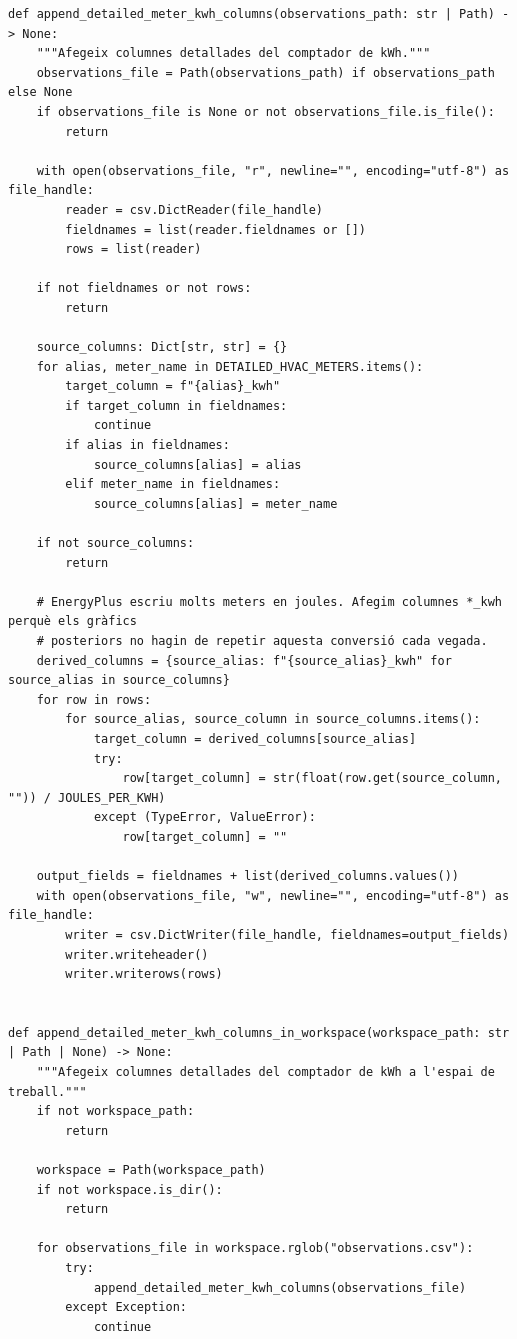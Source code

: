\documentclass[10pt,a4paper]{article}
\begin{document}
\begin{lstlisting}[style=studioPython,caption={backend/entrenar\_agent\_artifacts.py},label={lst:backend-entrenar-agent-artifacts-py}]
def append_detailed_meter_kwh_columns(observations_path: str | Path) -> None:
    """Afegeix columnes detallades del comptador de kWh."""
    observations_file = Path(observations_path) if observations_path else None
    if observations_file is None or not observations_file.is_file():
        return

    with open(observations_file, "r", newline="", encoding="utf-8") as file_handle:
        reader = csv.DictReader(file_handle)
        fieldnames = list(reader.fieldnames or [])
        rows = list(reader)

    if not fieldnames or not rows:
        return

    source_columns: Dict[str, str] = {}
    for alias, meter_name in DETAILED_HVAC_METERS.items():
        target_column = f"{alias}_kwh"
        if target_column in fieldnames:
            continue
        if alias in fieldnames:
            source_columns[alias] = alias
        elif meter_name in fieldnames:
            source_columns[alias] = meter_name

    if not source_columns:
        return

    # EnergyPlus escriu molts meters en joules. Afegim columnes *_kwh perquè els gràfics
    # posteriors no hagin de repetir aquesta conversió cada vegada.
    derived_columns = {source_alias: f"{source_alias}_kwh" for source_alias in source_columns}
    for row in rows:
        for source_alias, source_column in source_columns.items():
            target_column = derived_columns[source_alias]
            try:
                row[target_column] = str(float(row.get(source_column, "")) / JOULES_PER_KWH)
            except (TypeError, ValueError):
                row[target_column] = ""

    output_fields = fieldnames + list(derived_columns.values())
    with open(observations_file, "w", newline="", encoding="utf-8") as file_handle:
        writer = csv.DictWriter(file_handle, fieldnames=output_fields)
        writer.writeheader()
        writer.writerows(rows)


def append_detailed_meter_kwh_columns_in_workspace(workspace_path: str | Path | None) -> None:
    """Afegeix columnes detallades del comptador de kWh a l'espai de treball."""
    if not workspace_path:
        return

    workspace = Path(workspace_path)
    if not workspace.is_dir():
        return

    for observations_file in workspace.rglob("observations.csv"):
        try:
            append_detailed_meter_kwh_columns(observations_file)
        except Exception:
            continue



\end{lstlisting}
\end{document}
